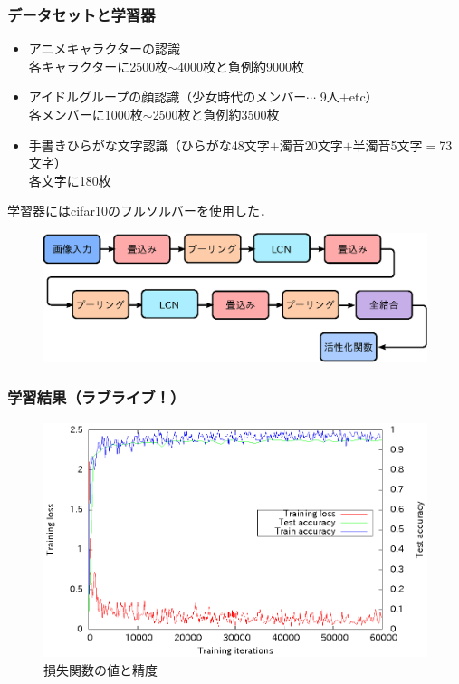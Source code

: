 \documentclass[dvipdfmx,11pt,notheorems]{beamer}
\theoremstyle{definition}
\begin{document}
\begin{frame}\frametitle{データセットと学習器}
\begin{itemize}
\item アニメキャラクターの認識\\
    各キャラクターに2500枚$\sim$4000枚と負例約9000枚
\item アイドルグループの顔認識（少女時代のメンバー$\cdots$ 9人$+$etc）\\
    各メンバーに1000枚$\sim$2500枚と負例約3500枚
\item 手書きひらがな文字認識（ひらがな48文字$+$濁音20文字$+$半濁音5文字$=$73文字）\\
    各文字に180枚
\end{itemize}
学習器にはcifar10のフルソルバーを使用した．
\begin{figure}[ht]
 \centering
 \includegraphics[scale=0.7]{fig/eps/cifar10Net_structure.eps}
\end{figure}
\end{frame}

\begin{frame}\frametitle{学習結果（ラブライブ！）}
 \begin{figure}[ht]
 \centering
 \includegraphics[scale=0.85]{fig/eps/result_train_test_lovelive_full.eps}
 \caption{損失関数の値と精度}
\end{figure}
\end{frame}
\end{document}
